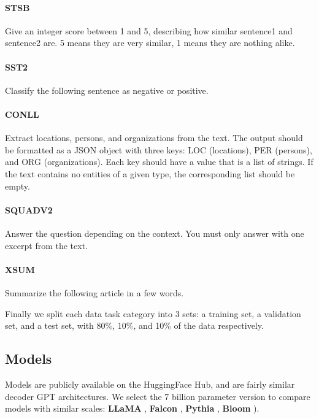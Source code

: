 \paragraph{STSB}  Give an integer score between 1 and 5, describing how similar sentence1 and sentence2 are. 5 means they are very similar, 1 means they are nothing alike.

\paragraph{SST2}  Classify the following sentence as negative or positive.

\paragraph{CONLL}  Extract locations, persons, and organizations from the text. The output should be formatted as a JSON object with three keys: LOC (locations), PER (persons), and ORG (organizations). Each key should have a value that is a list of strings. If the text contains no entities of a given type, the corresponding list should be empty.

\paragraph{SQUADV2}  Answer the question depending on the context. You must only answer with one excerpt from the text.

\paragraph{XSUM}  Summarize the following article in a few words.


Finally we split each data task category into 3 sets: a training set, a validation set, and a test set, with 80\%, 10\%, and 10\% of the data respectively.

\subsection{Models}
\label{sec:models}

Models are publicly available on the HuggingFace Hub, and are fairly similar decoder GPT architectures. We select the 7 billion parameter version to compare models with similar scales: \textbf{LLaMA} ,  \textbf{Falcon} , \textbf{Pythia} , \textbf{Bloom} ).



